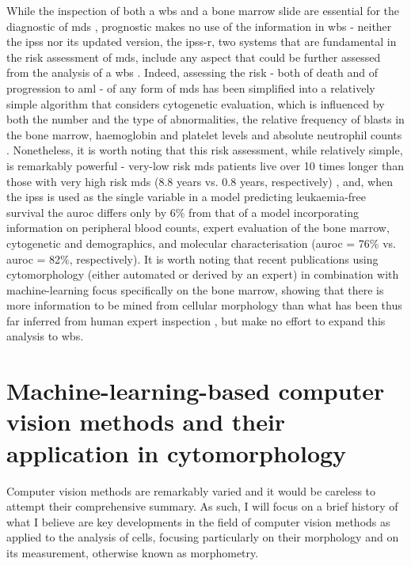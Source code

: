 While the inspection of both a \ac{wbs} and a bone marrow slide are essential for the diagnostic of \ac{mds} \cite{Greenberg2012-en,Arber2016-os}, prognostic makes no use of the information in \ac{wbs} - neither the \ac{ipss} nor its updated version, the \ac{ipss-r}, two systems that are fundamental in the risk assessment of \ac{mds}, include any aspect that could be further assessed from the analysis of a \ac{wbs} \cite{Greenberg2012-en}. Indeed, assessing the risk - both of death and of progression to \ac{aml} - of any form of \ac{mds} has been simplified into a relatively simple algorithm that considers cytogenetic evaluation, which is influenced by both the number and the type of abnormalities, the relative frequency of blasts in the bone marrow, haemoglobin and platelet levels and absolute neutrophil counts \cite{Greenberg2012-en}. Nonetheless, it is worth noting that this risk assessment, while relatively simple, is remarkably powerful - very-low risk \ac{mds} patients live over 10 times longer than those with very high risk \ac{mds} (8.8 years vs. 0.8 years, respectively) \cite{Greenberg2012-en}, and, when the \ac{ipss} is used as the single variable in a model predicting leukaemia-free survival the \ac{auroc} differs only by 6\% from that of a model incorporating information on peripheral blood counts, expert evaluation of the bone marrow, cytogenetic and demographics, and molecular characterisation (\ac{auroc} = 76\% vs. \ac{auroc} = 82\%, respectively). It is worth noting that recent publications using cytomorphology (either automated or derived by an expert) in combination with machine-learning focus specifically on the bone marrow, showing that there is more information to be mined from cellular morphology than what has been thus far inferred from human expert inspection \cite{Bruck2021-fx,Nagata2020-lh}, but make no effort to expand this analysis to \ac{wbs}. 

\section{Machine-learning-based computer vision methods and their application in cytomorphology}

Computer vision methods are remarkably varied and it would be careless to attempt their comprehensive summary. As such, I will focus on a brief history of what I believe are key developments in the field of computer vision methods as applied to the analysis of cells, focusing particularly on their morphology and on its measurement, otherwise known as morphometry.

